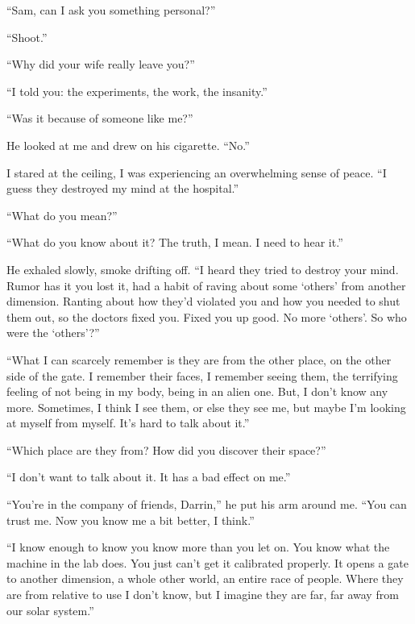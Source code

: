 ``Sam, can I ask you something personal?''

``Shoot.''

``Why did your wife really leave you?''

``I told you: the experiments, the work, the insanity.''

``Was it because of someone like me?''

He looked at me and drew on his cigarette. ``No.''

I stared at the ceiling, I was experiencing an overwhelming sense of
peace. ``I guess they destroyed my mind at the hospital.''

``What do you mean?''

``What do you know about it? The truth, I mean. I need to hear it.''

He exhaled slowly, smoke drifting off. ``I heard they tried to destroy
your mind. Rumor has it you lost it, had a habit of raving about some
`others' from another dimension. Ranting about how they'd violated you
and how you needed to shut them out, so the doctors fixed you. Fixed you
up good. No more `others'. So who were the `others'?''

``What I can scarcely remember is they are from the other place, on the
other side of the gate. I remember their faces, I remember seeing them,
the terrifying feeling of not being in my body, being in an alien one.
But, I don't know any more. Sometimes, I think I see them, or else they
see me, but maybe I'm looking at myself from myself. It's hard to talk
about it.''

``Which place are they from? How did you discover their space?''

``I don't want to talk about it. It has a bad effect on me.''

``You're in the company of friends, Darrin,'' he put his arm around me.
``You can trust me. Now you know me a bit better, I think.''

``I know enough to know you know more than you let on. You know what the
machine in the lab does. You just can't get it calibrated properly. It
opens a gate to another dimension, a whole other world, an entire race
of people. Where they are from relative to use I don't know, but I
imagine they are far, far away from our solar system.''

